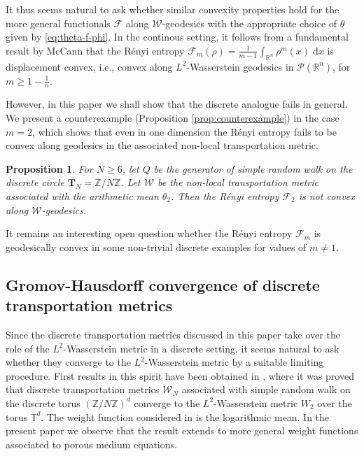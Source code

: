 \documentclass[a4paper,11pt,reqno]{amsart}
\theoremstyle{plain}
\newtheorem{proposition}[theorem]{Proposition}
\theoremstyle{remark}
\numberwithin{equation}{section}
\begin{document}
It thus seems natural to ask whether similar convexity properties hold
for the more general functionals ${\mathcal{F}}$ along ${\mathcal{W}}$-geodesics with the
appropriate choice of $\theta$ given by \eqref{eq:theta-f-phi}. In the
continous setting, it follows from a fundamental result by McCann
\cite{McC97} that the R\'enyi entropy ${\mathcal{F}}_m(\rho) = \frac{1}{m-1}
\int_{{{\mathbb R}}^n} \rho^m(x) {\; \mathrm{d}} x$ is displacement convex, i.e., convex
along $L^2$-Wasserstein geodesics in ${\mathscr{P}}({{\mathbb R}}^n)$, for $m \geq 1 -
\frac1n$.

However, in this paper we shall show that the discrete analogue fails
in general. We present a counterexample (Proposition
\ref{prop:counterexample}) in the case $m = 2$, which shows that even
in one dimension the R\'enyi entropy fails to be convex along
geodesics in the associated non-local transportation metric.

\begin{proposition}\label{prop:intro-counterexample}
  For $N \geq 6$, let $Q$ be the generator of simple random walk on
  the discrete circle ${\mathbf{T}}_N={{\mathbb Z}}/N{{\mathbb Z}}$. Let ${\mathcal{W}}$ be the non-local
  transportation metric associated with the arithmetic mean
  $\theta_2$. Then the R\'enyi entropy ${\mathcal{F}}_2$ is \emph{not} convex
  along ${\mathcal{W}}$-geodesics.
\end{proposition}

It remains an interesting open question whether the R\'enyi entropy
${\mathcal{F}}_m$ is geodesically convex in some non-trivial discrete examples
for values of $m \neq 1$.

\subsection{Gromov-Hausdorff convergence of discrete transportation metrics}
Since the discrete transportation metrics discussed in this paper take
over the role of the $L^2$-Wasserstein metric in a discrete setting,
it seems natural to ask whether they converge to the $L^2$-Wasserstein
metric by a suitable limiting procedure. First results in this spirit
have been obtained in \cite{GM12}, where it was proved that discrete
transportation metrics ${\mathcal{W}}_N$ associated with simple random walk on
the discrete torus $({{\mathbb Z}} / N {{\mathbb Z}})^d$ converge to the $L^2$-Wasserstein
metric $W_2$ over the torus $\mathbb{T}^d$. The weight function
considered in \cite{GM12} is the logarithmic mean. In the present
paper we observe that the result extends to more general weight
functions associated to porous medium equations.
\end{document}
